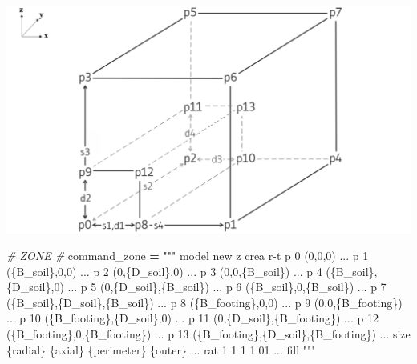 \documentclass[a4paper, nobind]{templates/ociamthesis}
\newenvironment{Shaded}{\begin{snugshade}}{\end{snugshade}}
\newcommand{\CommentTok}[1]{\textcolor[rgb]{0.56,0.35,0.01}{\textit{#1}}}
\newcommand{\NormalTok}[1]{#1}
\newcommand{\OperatorTok}[1]{\textcolor[rgb]{0.81,0.36,0.00}{\textbf{#1}}}
\newcommand{\SpecialCharTok}[1]{\textcolor[rgb]{0.00,0.00,0.00}{#1}}
\newcommand{\StringTok}[1]{\textcolor[rgb]{0.31,0.60,0.02}{#1}}
\renewenvironment{Shaded}
{
  \vspace{10pt}%
  \begin{snugshade}%
}{%
  \end{snugshade}%
  \vspace{8pt}%
}
\begin{document}
\includegraphics[width=1\linewidth]{myfigureeeeee/final-block-square1}

\begin{Shaded}
\begin{Highlighting}[]
\CommentTok{\# ZONE \#}
\NormalTok{command\_zone }\OperatorTok{=} \StringTok{"""}
\StringTok{model new}
\StringTok{z crea r{-}t p 0 (0,0,0) ...}
\StringTok{           p 1 (}\SpecialCharTok{\{B\_soil\}}\StringTok{,0,0) ... }
\StringTok{           p 2 (0,}\SpecialCharTok{\{D\_soil\}}\StringTok{,0) ...}
\StringTok{           p 3 (0,0,}\SpecialCharTok{\{B\_soil\}}\StringTok{) ...}
\StringTok{           p 4 (}\SpecialCharTok{\{B\_soil\}}\StringTok{,}\SpecialCharTok{\{D\_soil\}}\StringTok{,0) ...}
\StringTok{           p 5 (0,}\SpecialCharTok{\{D\_soil\}}\StringTok{,}\SpecialCharTok{\{B\_soil\}}\StringTok{) ...}
\StringTok{           p 6 (}\SpecialCharTok{\{B\_soil\}}\StringTok{,0,}\SpecialCharTok{\{B\_soil\}}\StringTok{) ...}
\StringTok{           p 7 (}\SpecialCharTok{\{B\_soil\}}\StringTok{,}\SpecialCharTok{\{D\_soil\}}\StringTok{,}\SpecialCharTok{\{B\_soil\}}\StringTok{) ...}
\StringTok{           p 8 (}\SpecialCharTok{\{B\_footing\}}\StringTok{,0,0) ...}
\StringTok{           p 9 (0,0,}\SpecialCharTok{\{B\_footing\}}\StringTok{) ...}
\StringTok{           p 10 (}\SpecialCharTok{\{B\_footing\}}\StringTok{,}\SpecialCharTok{\{D\_soil\}}\StringTok{,0) ...}
\StringTok{           p 11 (0,}\SpecialCharTok{\{D\_soil\}}\StringTok{,}\SpecialCharTok{\{B\_footing\}}\StringTok{) ...}
\StringTok{           p 12 (}\SpecialCharTok{\{B\_footing\}}\StringTok{,0,}\SpecialCharTok{\{B\_footing\}}\StringTok{) ...}
\StringTok{           p 13 (}\SpecialCharTok{\{B\_footing\}}\StringTok{,}\SpecialCharTok{\{D\_soil\}}\StringTok{,}\SpecialCharTok{\{B\_footing\}}\StringTok{) ...}
\StringTok{           size }\SpecialCharTok{\{radial\}}\StringTok{ }\SpecialCharTok{\{axial\}}\StringTok{ }\SpecialCharTok{\{perimeter\}}\StringTok{ }\SpecialCharTok{\{outer\}}\StringTok{ ...}
\StringTok{           rat 1 1 1 1.01 ...}
\StringTok{           fill}
\StringTok{"""}


\end{Highlighting}
\end{Shaded}
\end{document}
